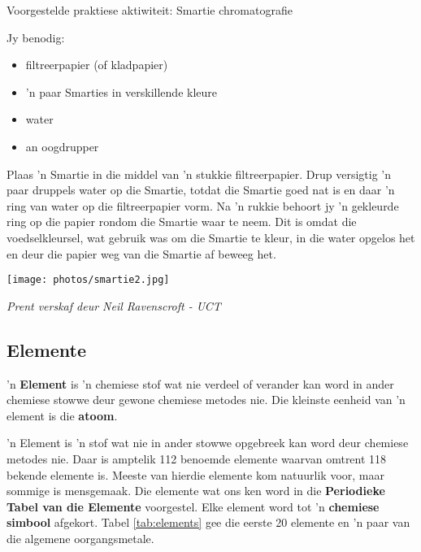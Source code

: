 \begin{activity}{Voorgestelde praktiese aktiwiteit: Smartie chromatografie}{
Jy benodig:
\begin{itemize}[noitemsep]
\item filtreerpapier (of kladpapier)
\item 'n paar Smarties in verskillende kleure
\item water
\item an oogdrupper
\end{itemize}
\begin{minipage}{.5\textwidth}
Plaas 'n Smartie in die middel van 'n stukkie filtreerpapier. Drup versigtig 'n paar druppels water op die Smartie, totdat die Smartie goed nat is en daar 'n ring van water op die filtreerpapier vorm. Na 'n rukkie behoort jy 'n gekleurde ring op die papier rondom die Smartie waar te neem. Dit is omdat die voedselkleursel, wat gebruik was om die Smartie te kleur, in die water opgelos het en deur die papier weg van die Smartie af beweeg het.
\end{minipage}
\begin{minipage}{.5\textwidth}
\begin{center}
 \texttt{[image: photos/smartie2.jpg]}\par
\textit{Prent verskaf deur Neil Ravenscroft - UCT}
\end{center}
\end{minipage}
}
\end{activity}
\par 
	\par
      \label{m38708*uid25}
            \subsection*{Elemente}
            \nopagebreak
        \label{m38708*id63302} 'n \textbf{Element} is 'n chemiese stof wat nie verdeel of verander kan word in ander chemiese stowwe deur gewone chemiese metodes nie. Die kleinste eenheid van 'n element is die \textbf{atoom}.\par 
\label{m38708*fhsst!!!underscore!!!id193}
{ \label{m38708*meaningfhsst!!!underscore!!!id193}
 'n Element is 'n stof wat nie in ander stowwe opgebreek kan word deur chemiese metodes nie.} 
        \label{m38708*id63334}Daar is amptelik 112 benoemde elemente waarvan omtrent 118 bekende elemente is. Meeste van hierdie elemente kom natuurlik voor, maar sommige is mensgemaak. Die elemente wat ons ken word in die \textbf{Periodieke Tabel van die Elemente} voorgestel. Elke element word tot 'n \textbf{chemiese simbool} afgekort. Tabel \ref{tab:elements} gee die eerste 20 elemente en 'n paar van die algemene oorgangsmetale.\par \label{m38708*eip-775}

